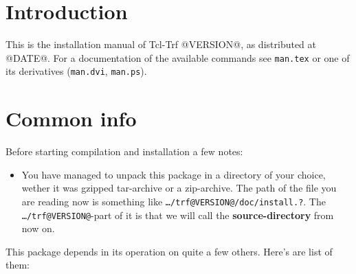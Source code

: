 \def\strong#1{{\bf #1}}
\def\lang#1{{\tt #1}}
\def\file#1{{\tt #1}}
\def\arg#1{{\tt $<$#1$>$}}
\def\trf{\strong {trf}}
\def\blob{\strong {blob}}
\def\blobx{\strong {blobX}}
\def\tcl{\lang {tcl}}
\def\tclsh{\cmd {tclsh}}
\def\wish{\cmd {wish}}
\def\cmd#1{{\tt #1}}
\def\opt#1{{\tt #1}}
\def\man#1{{\tt #1}}
\def\lib#1{{\tt #1}}
\def\url#1{{\tt #1}}
\def\tm{$^{(tm)}$}
\def\ra{$\rightarrow$}
\def\eq{$\equiv$}

\def\version{1.0}

\tableofcontents

\chapter {Introduction}
This is the installation manual of Tcl-Trf @VERSION@, as distributed
at @DATE@. For a documentation of the available commands see \file
{man.tex} or one of its derivatives (\file {man.dvi}, \file {man.ps}).


\chapter {Common info}

Before starting compilation and installation a few notes:

\begin{itemize}
\item	You have managed to unpack this package in a directory of
	your choice, wether it was gzipped tar-archive or a
	zip-archive. The path of the file you are reading now is
	something like \file {\dots{}/trf@VERSION@/doc/install.?}.
	The \file {\dots{}/trf@VERSION@}-part of it is that we will
	call the \strong {source-directory} from now on.
\end{itemize}

This package depends in its operation on quite a few others. Here's
are list of them:

